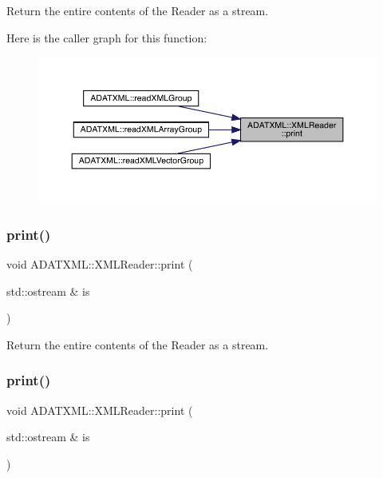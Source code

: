 Return the entire contents of the Reader as a stream. 

Here is the caller graph for this function\+:
\nopagebreak
\begin{figure}[H]
\begin{center}
\leavevmode
\includegraphics[width=350pt]{db/d3f/classADATXML_1_1XMLReader_a72513fe6f299e02428bdf4d225163f50_icgraph}
\end{center}
\end{figure}
\mbox{\label{classADATXML_1_1XMLReader_a72513fe6f299e02428bdf4d225163f50}} 
\subsubsection{\texorpdfstring{print()}{print()}\hspace{0.1cm}{\footnotesize\ttfamily [2/3]}}
{\footnotesize\ttfamily void A\+D\+A\+T\+X\+M\+L\+::\+X\+M\+L\+Reader\+::print (\begin{DoxyParamCaption}\item[{std\+::ostream \&}]{is }\end{DoxyParamCaption})}



Return the entire contents of the Reader as a stream. 

\mbox{\label{classADATXML_1_1XMLReader_a72513fe6f299e02428bdf4d225163f50}} 
\subsubsection{\texorpdfstring{print()}{print()}\hspace{0.1cm}{\footnotesize\ttfamily [3/3]}}
{\footnotesize\ttfamily void A\+D\+A\+T\+X\+M\+L\+::\+X\+M\+L\+Reader\+::print (\begin{DoxyParamCaption}\item[{std\+::ostream \&}]{is }\end{DoxyParamCaption})}




